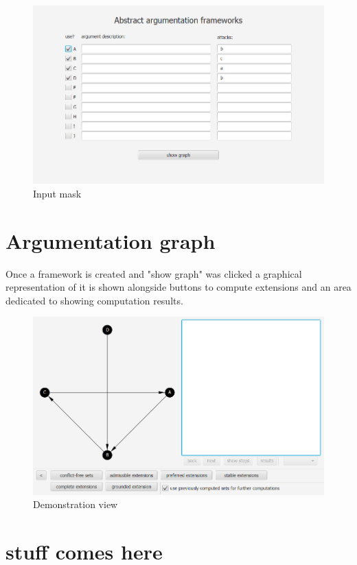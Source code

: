 \documentclass[draft,final]{vutinfth} %
\begin{document}
\FloatBarrier
	\centering
	\begin{figure}[!htb]
		\includegraphics[width=\linewidth]{pics/input.png}
		\caption{Input mask}
	\end{figure}
\FloatBarrier

\section{Argumentation graph}
Once a framework is created and "show graph" was clicked a graphical representation of it is shown alongside buttons to compute extensions and an area dedicated to showing computation results.

\FloatBarrier
	\centering
	\begin{figure}[!htb]
		\includegraphics[width=\linewidth]{pics/demo.png}
		\caption{Demonstration view}
	\end{figure}
\FloatBarrier

\section{stuff comes here}

\backmatter




\printindex

\printglossaries
\end{document}
